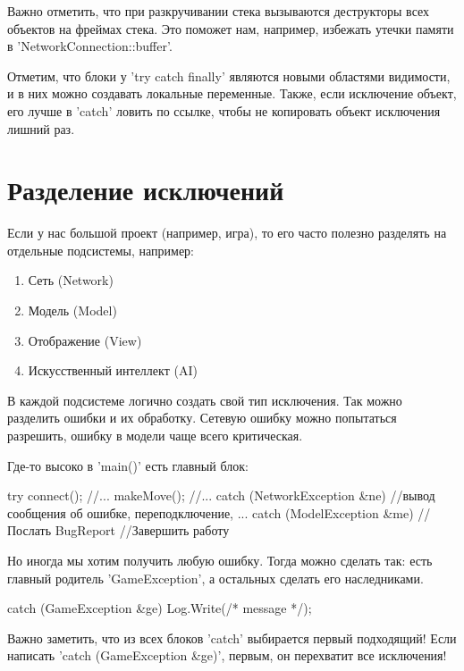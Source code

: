 Важно отметить, что при разкручивании стека вызываются деструкторы всех объектов на фреймах стека.
Это поможет нам, например, избежать утечки памяти в \cpp'NetworkConnection::buffer'.

Отметим, что блоки у \cpp'try catch finally' являются новыми областями видимости, и в них можно создавать локальные переменные.
Также, если исключение объект, его лучше в \cpp'catch' ловить по ссылке, чтобы не копировать объект исключения лишний раз.

\section{Разделение исключений}

Если у нас большой проект (например, игра), то его часто полезно разделять на отдельные подсистемы, например:
\begin{enumerate}
	\item Сеть (Network)
	\item Модель (Model)
	\item Отображение (View)
	\item Искусственный интеллект (AI)
\end{enumerate}

В каждой подсистеме логично создать свой тип исключения.
Так можно разделить ошибки и их обработку.
Сетевую ошибку можно попытаться разрешить, ошибку в модели чаще всего критическая.

Где-то высоко в \cpp'main()' есть главный блок:
\begin{cppcode}
try {
	connect();
	//...
	makeMove();
	//...
}
catch (NetworkException &ne) {
	//вывод сообщения об ошибке, переподключение, ...
}
catch (ModelException &me) {
	//Послать BugReport
	//Завершить работу
}
\end{cppcode}

Но иногда мы хотим получить любую ошибку.
Тогда можно сделать так: есть главный родитель \cpp'GameException', а остальных сделать его наследниками.
\begin{cppcode}
catch (GameException &ge) {
	Log.Write(/* message */);
}
\end{cppcode}

Важно заметить, что из всех блоков \cpp'catch' выбирается первый подходящий!
Если написать \cpp'catch (GameException &ge)', первым, он перехватит все исключения!

